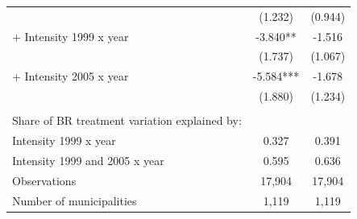 \begin{tabular}{lcc}
 & (1.232) & (0.944) \\ 
\quad + Intensity 1999 x year & -3.840** & -1.516 \\ 
 & (1.737) & (1.067) \\ 
\quad + Intensity 2005 x year & -5.584*** & -1.678 \\ 
 & (1.880) & (1.234) \\ 
  & & \\ 
Share of BR treatment variation explained by: & & \\ 
\quad Intensity 1999 x year & 0.327 & 0.391 \\ 
\quad Intensity 1999 and 2005 x year & 0.595 & 0.636 \\ 
Observations & 17,904 & 17,904 \\ 
Number of municipalities & 1,119 & 1,119 \\ 
\bottomrule
\end{tabular}